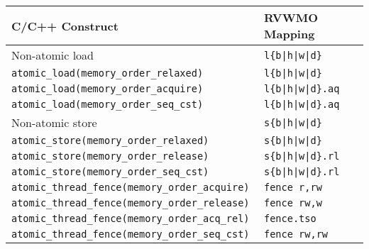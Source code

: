 \begin{table}[h!]
  \centering
  \begin{tabular}{|l|l|}
    \hline
    C/C++ Construct                            & RVWMO Mapping \\
    \hline
    \hline
    Non-atomic load                            & \tt l\{b|h|w|d\}               \\
    \hline
    \tt atomic\_load(memory\_order\_relaxed)   & \tt l\{b|h|w|d\}               \\
    \hline
    \tt atomic\_load(memory\_order\_acquire)   & \tt l\{b|h|w|d\}.aq  \\
    \hline
    \tt atomic\_load(memory\_order\_seq\_cst)  & \tt l\{b|h|w|d\}.aq  \\
    \hline
    \hline
    Non-atomic store                           & \tt s\{b|h|w|d\}               \\
    \hline
    \tt atomic\_store(memory\_order\_relaxed)  & \tt s\{b|h|w|d\}               \\
    \hline
    \tt atomic\_store(memory\_order\_release)  & \tt s\{b|h|w|d\}.rl  \\
    \hline
    \tt atomic\_store(memory\_order\_seq\_cst) & \tt s\{b|h|w|d\}.rl \\
    \hline
    \hline
    \tt atomic\_thread\_fence(memory\_order\_acquire)  & \tt fence r,rw \\
    \hline
    \tt atomic\_thread\_fence(memory\_order\_release)  & \tt fence rw,w \\
    \hline
    \tt atomic\_thread\_fence(memory\_order\_acq\_rel) & {\tt fence.tso} \\
    \hline
    \tt atomic\_thread\_fence(memory\_order\_seq\_cst) & \tt fence rw,rw \\
    \hline
  \end{tabular}

~


\end{table}

